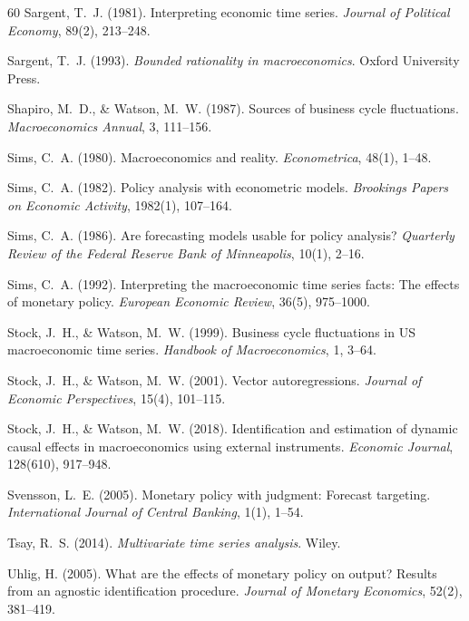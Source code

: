 \documentclass[12pt,a4paper]{article}
\begin{document}
\begin{thebibliography}{60}
 Sargent, T.~J. (1981). Interpreting economic time series. \textit{Journal of Political Economy}, 89(2), 213--248.

 Sargent, T.~J. (1993). \textit{Bounded rationality in macroeconomics}. Oxford University Press.

 Shapiro, M.~D., \& Watson, M.~W. (1987). Sources of business cycle fluctuations. \textit{Macroeconomics Annual}, 3, 111--156.

 Sims, C.~A. (1980). Macroeconomics and reality. \textit{Econometrica}, 48(1), 1--48.

 Sims, C.~A. (1982). Policy analysis with econometric models. \textit{Brookings Papers on Economic Activity}, 1982(1), 107--164.

 Sims, C.~A. (1986). Are forecasting models usable for policy analysis? \textit{Quarterly Review of the Federal Reserve Bank of Minneapolis}, 10(1), 2--16.

 Sims, C.~A. (1992). Interpreting the macroeconomic time series facts: The effects of monetary policy. \textit{European Economic Review}, 36(5), 975--1000.

 Stock, J.~H., \& Watson, M.~W. (1999). Business cycle fluctuations in US macroeconomic time series. \textit{Handbook of Macroeconomics}, 1, 3--64.

 Stock, J.~H., \& Watson, M.~W. (2001). Vector autoregressions. \textit{Journal of Economic Perspectives}, 15(4), 101--115.

 Stock, J.~H., \& Watson, M.~W. (2018). Identification and estimation of dynamic causal effects in macroeconomics using external instruments. \textit{Economic Journal}, 128(610), 917--948.

 Svensson, L.~E. (2005). Monetary policy with judgment: Forecast targeting. \textit{International Journal of Central Banking}, 1(1), 1--54.

 Tsay, R.~S. (2014). \textit{Multivariate time series analysis}. Wiley.

 Uhlig, H. (2005). What are the effects of monetary policy on output? Results from an agnostic identification procedure. \textit{Journal of Monetary Economics}, 52(2), 381--419.


\end{thebibliography}
\end{document}
